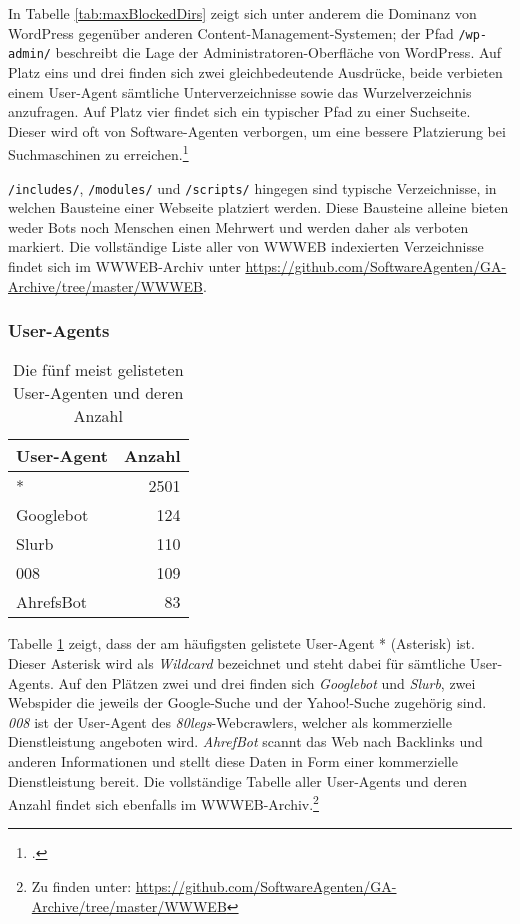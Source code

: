 In Tabelle \ref{tab:maxBlockedDirs} zeigt sich unter anderem die Dominanz von
WordPress gegenüber anderen Content-Management-Systemen; der Pfad
\texttt{/wp-admin/} beschreibt die Lage der Administratoren-Oberfläche von
WordPress. Auf Platz eins und drei finden sich zwei gleichbedeutende Ausdrücke,
beide verbieten einem User-Agent sämtliche Unterverzeichnisse sowie das
Wurzelverzeichnis anzufragen. Auf Platz vier findet sich ein typischer Pfad zu
einer Suchseite. Dieser wird oft von Software-Agenten verborgen, um eine
bessere Platzierung bei Suchmaschinen zu erreichen.\footcite{siteSearchSEO}

\texttt{/includes/}, \texttt{/modules/} und \texttt{/scripts/} hingegen sind
typische Verzeichnisse, in welchen Bausteine einer Webseite platziert werden.
Diese Bausteine alleine bieten weder Bots noch Menschen einen Mehrwert und
werden daher als verboten markiert. Die vollständige Liste aller von WWWEB
indexierten Verzeichnisse findet sich im WWWEB-Archiv unter
\url{https://github.com/SoftwareAgenten/GA-Archive/tree/master/WWWEB}.

\subsubsection{User-Agents}
\label{ssub:user-agents}

\begin{table}[h]
  \begin{tabular}{ l|r }
    \textbf{User-Agent} & \textbf{Anzahl}\\
    \hline
    *         & 2501 \\
    Googlebot & 124  \\
    Slurb     & 110  \\
    008       & 109  \\
    AhrefsBot & 83   \\
  \end{tabular}
  
  \caption{Die fünf meist gelisteten User-Agenten und deren Anzahl}
  \label{tab:maxUA}
\end{table}

Tabelle \ref{tab:maxUA} zeigt, dass der am häufigsten gelistete User-Agent *
(Asterisk) ist. Dieser Asterisk wird als \emph{Wildcard} bezeichnet und steht
dabei für sämtliche User-Agents. Auf den Plätzen zwei und drei finden sich
\emph{Googlebot} und \emph{Slurb}, zwei Webspider die
jeweils der Google-Suche und der Yahoo!-Suche zugehörig sind. \emph{008} ist
der User-Agent des \emph{80legs}-Webcrawlers, welcher als kommerzielle
Dienstleistung angeboten wird. \emph{AhrefBot} scannt das Web nach Backlinks
und anderen Informationen und stellt diese Daten in Form einer kommerzielle
Dienstleistung bereit. Die vollständige Tabelle aller User-Agents und deren
Anzahl findet sich ebenfalls im WWWEB-Archiv.\footnote{Zu finden unter:
\url{https://github.com/SoftwareAgenten/GA-Archive/tree/master/WWWEB}}
